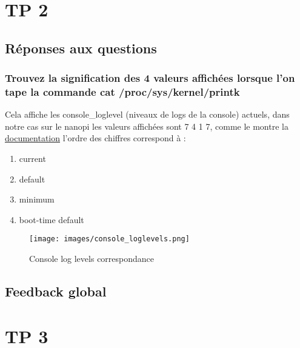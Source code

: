 \documentclass{ReportTemplate}
\begin{document}
\chapter{TP 2}
\section{Réponses aux questions}
\subsection{Trouvez la signification des 4 valeurs affichées lorsque l’on tape la commande cat /proc/sys/kernel/printk}
Cela affiche les console\_loglevel (niveaux de logs de la console) actuels, dans notre cas sur le nanopi les valeurs affichées sont 7 4 1 7, comme le montre la \href{https://www.kernel.org/doc/html/latest/core-api/printk-basics.html}{documentation} l'ordre des chiffres correspond à :
\begin{enumerate}
    \item current
    \item default
    \item minimum
    \item boot-time default
\end{enumerate}

\begin{figure}[H]
    \centering
    \texttt{[image: images/console\_loglevels.png]}
    \caption{Console log levels correspondance}
    \label{fig:LogLevels}
\end{figure}

\section{Feedback global}

\chapter{TP 3}
\end{document}
